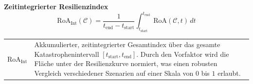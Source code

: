 \begin{minipage}[t]{\textwidth}
    \centering
    \small
    \textbf{Zeitintegrierter Resilienzindex}
    \begin{equation*}
        \text{RoA}_{\text{Int}}(\mathcal{C}) = \frac{1}{t_{\text{end}} - t_{\text{start}}} \int_{t_{\text{start}}}^{t_{\text{end}}} \text{RoA}(\mathcal{C}, t) \, dt
    \end{equation*}
    \raggedright
    \footnotesize

\end{minipage}
\vspace{2mm}

\noindent
\begin{tabularx}{\textwidth}{@{}l X@{}}
    $\text{RoA}_{\text{Int}}$ & Akkumulierter, zeitintegrierter Gesamtindex über das gesamte Katastrophenintervall $[t_{\text{start}}, t_{\text{end}}]$.
    Durch den Vorfaktor wird die Fläche unter der Resilienzkurve normiert, was einen robusten Vergleich verschiedener Szenarien auf einer Skala von $0$ bis $1$ erlaubt.
\end{tabularx}
